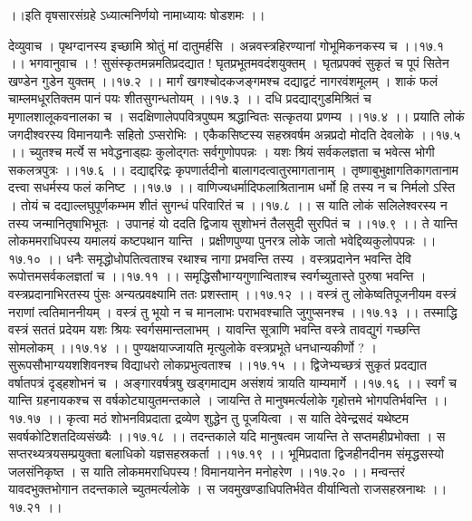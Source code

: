 \documentclass[11pt]{book}
\begin{document}
\begin{landscape}
 ।।इति वृषसारसंग्रहे ऽध्यात्मनिर्णयो नामाध्यायः षोडशमः ।।




देव्युवाच ।
पृथग्दानस्य इच्छामि श्रोतुं मां दातुमर्हसि ।
अन्नवस्त्रहिरण्यानां गोभूमिकनकस्य च ।।१७.१ ।।
भगवानुवाच ।
! सुसंस्कृतमन्नमतिप्रदद्यात
! घृतप्रभूतमवदंशयुक्तम् ।
घृतप्रपक्वं सुकृतं च पूपं
सितेन खण्डेन गुडेन युक्तम् ।।१७.२ ।।
मार्गं खगश्चोदकजङ्गमश्च
दद्याद्वटं नागरवंशमूलम् ।
शाकं फलं चाम्लमधूरतिक्तम
पानं पयः शीतसुगन्धतोयम् ।।१७.३ ।।
दधि प्रदद्याद्गुडमिश्रितं च
मृणालशालूकवनालका च ।
सदक्षिणालेपपवित्रपुष्पम
श्रद्धान्वितः सत्कृतया प्रणम्य ।।१७.४ ।।
प्रयाति लोकं जगदीश्वरस्य
विमानयानैः सहितो ऽप्सरोभिः ।
एकैकसिष्टस्य सहस्रवर्षम
अन्नप्रदो मोदति देवलोके ।।१७.५ ।।
च्युतश्च मर्त्ये स भवेद्धनाड्ह्यः
कुलोद्गतः सर्वगुणोपपन्नः ।
यशः श्रियं सर्वकलज्ञता च
भवेत्स भोगी सकलत्रपुत्रः ।।१७.६ ।।
दद्याद्दरिद्रः कृपणार्तदीनो
बालागदत्वातुरमागतानाम् ।
तृष्णाबुभुक्षागतिकागतानाम
दत्त्वा सधर्मस्य फलं कनिष्ट ।।१७.७ ।।
वाणिज्यधर्मादिफलाश्रितानाम
धर्मो हि तस्य न च निर्मलो ऽस्ति ।
तोयं च दद्याल्लघुपूर्णकम्भम
शीतं सुगन्धं परिवारितं च ।।१७.८ ।।
स याति लोकं सलिलेश्वरस्य
न तस्य जन्मानितृषाभिभूतः ।
उपानहं यो ददति द्विजाय
सुशोभनं तैलसुदी सुरपितं च ।।१७.९ ।।
ते यान्ति लोकममराधिपस्य
यमालयं कष्टपथान यान्ति ।
प्रक्षीणपुण्या पुनरत्र लोके
जातो भवेद्दिव्यकुलोपपन्नः ।।१७.१० ।।
धनैः समृद्धोधोपतित्वताश्च
रथाश्च नागा प्रभवन्ति तस्य ।
वस्त्रप्रदानेन भवन्ति देवि
रूपोत्तमसर्वकलज्ञतां च ।।१७.११ ।।
समृद्धिसौभाग्यगुणान्विताश्च
स्वर्गच्युतास्ते पुरुषा भवन्ति ।
वस्त्रप्रदानाभिरतस्य पुंसः
अन्यत्प्रवक्ष्यामि ततः प्रशस्ताम् ।।१७.१२ ।।
वस्त्रं तु लोकेष्वतिपूजनीयम
वस्त्रं नराणां त्वतिमाननीयम् ।
वस्त्रं तु भूयो न च मानलाभः
पराभवश्चाति जुगुप्सनश्च ।।१७.१३ ।।
तस्माद्धि वस्त्रं सततं प्रदेयम
यशः श्रियः स्वर्गसमान्तलाभम् ।
यावन्ति सूत्राणि भवन्ति वस्त्रे
तावद्युगं गच्छन्ति सोमलोकम् ।।१७.१४ ।।
पुण्यक्षयाज्जायति मृत्युलोके
वस्त्रप्रभूते धनधान्यकीर्णो ? ।
सुरूपसौभाग्ययशशिवनश्च
विद्याधरो लोकप्रभुत्वताश्च ।।१७.१५ ।।
द्विजेभ्यच्छत्रं सुकृतं प्रदद्यात
वर्षातपत्रं दृड्हशोभनं च ।
अङ्गारवर्षत्रषु खड्गमाद्यम
असंशयं त्रायति याम्यमार्गे ।।१७.१६ ।।
स्वर्गं च यान्ति ग्रहनायकश्च
स वर्षकोट्यायुतमन्तकाले ।
जायन्ति ते मानुषमर्त्यलोके
गृहोत्तमे भोगपतिर्भवन्ति ।।१७.१७ ।।
कृत्वा मठं शोभनविप्रदाता
द्रव्येण शुद्धेन तु पूजयित्वा ।
स याति देवेन्द्रसदं यथेष्टम
सवर्षकोटिशतदिव्यसंख्यैः ।।१७.१८ ।।
तदन्तकाले यदि मानुषत्वम
जायन्ति ते सप्तमहीप्रभोक्ता ।
स सप्तरथ्यत्रयसम्प्रयुक्ता
बलाधिको यज्ञसहस्रकर्ता ।।१७.१९ ।।
भूमिप्रदाता द्विजहीनदीनम
संमृद्धसस्यो जलसंनिकृष्त ।
स याति लोकममराधिपस्य !
विमानयानेन मनोहरेण ।।१७.२० ।।
मन्वन्तरं यावदभुक्तभोगान
तदन्तकाले च्युतमर्त्यलोके ।
स जवमुखण्डाधिपतिर्भवेत
वीर्यान्वितो राजसहस्रनाथः ।।१७.२१ ।।

\end{landscape}
\end{document}
